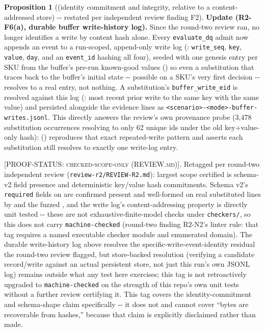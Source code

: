 \documentclass[11pt,a4paper]{article}
\theoremstyle{definition}
\newtheorem{proposition}{Proposition}
\newcommand{\proofstatus}[1]{[\textsc{PROOF-STATUS}: \textsc{#1}]}
\begin{document}
\begin{proposition}[(identity commitment and integrity, relative to a content-addressed store) -{}- restated per independent review finding F2]
\noindent\textbf{Update (R2-F6(a), durable buffer write-history log).} Since the round-two review ran,  no longer identifies a write by content hash alone. Every \texttt{evaluate\_dq} admit now appends an event to a run-scoped, append-only write log (: \texttt{write\_seq}, \texttt{key}, \texttt{value}, \texttt{day}, and an \texttt{event\_id} hashing all four), seeded with one genesis entry per SKU from the buffer's pre-run known-good values () so even a substitution that traces back to the buffer's initial state -{}- possible on a SKU's very first decision -{}- resolves to a real entry, not nothing. A substitution's \texttt{buffer\_write\_eid} is resolved against this log (: most recent prior write to the same key with the same value) and persisted alongside the evidence lines as \texttt{<scenario>-<mode>-buffer-writes.jsonl}. This directly answers the review's own provenance probe (3,478 substitution occurrences resolving to only 62 unique ids under the old key+value-only hash):  () reproduces that exact repeated-write pattern and asserts each substitution still resolves to exactly one write-log entry.

\proofstatus{checked-scope-only (REVIEW.md)}. Retagged per round-two independent review (\texttt{review-r2/REVIEW-R2.md}): largest scope certified is schema-v2 field presence and deterministic key/value hash commitments. Schema v2's \texttt{required} fields on  are confirmed present and well-formed on real substituted lines by  and the fuzzed , and the write log's content-addressing property is directly unit tested -{}- these are not exhaustive-finite-model checks under \texttt{checkers/}, so this does not carry \texttt{machine-checked} (round-two finding R2-N2's linter rule: that tag requires a named executable checker module and enumerated domain). The durable write-history log above resolves the specific-write-event-identity residual the round-two review flagged, but store-backed resolution (verifying a candidate record/write against an actual persistent store, not just this run's own JSONL log) remains outside what any test here exercises; this tag is not retroactively upgraded to \texttt{machine-checked} on the strength of this repo's own unit tests without a further review certifying it. This tag covers the identity-commitment and schema-shape claim specifically -{}- it does not and cannot cover ``bytes are recoverable from hashes,'' because that claim is explicitly disclaimed rather than made.
\end{proposition}
\end{document}
